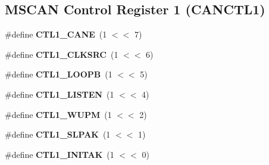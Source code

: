\subsection*{M\+S\+C\+AN Control Register 1 (C\+A\+N\+C\+T\+L1)}
\begin{DoxyCompactItemize}
\item 
\mbox{\label{group__RTEMSBSPsPowerPCGen5200MSCAN_ga63a460e6d53da309fdd802b6433c9d5c}} 
\#define {\bfseries C\+T\+L1\+\_\+\+C\+A\+NE}~(1 $<$$<$ 7)
\item 
\mbox{\label{group__RTEMSBSPsPowerPCGen5200MSCAN_ga483f0746def409e9401b160332e706be}} 
\#define {\bfseries C\+T\+L1\+\_\+\+C\+L\+K\+S\+RC}~(1 $<$$<$ 6)
\item 
\mbox{\label{group__RTEMSBSPsPowerPCGen5200MSCAN_gaa74191bc7035b62fa6fd2458c4c1044d}} 
\#define {\bfseries C\+T\+L1\+\_\+\+L\+O\+O\+PB}~(1 $<$$<$ 5)
\item 
\mbox{\label{group__RTEMSBSPsPowerPCGen5200MSCAN_gaf1ab39a91e5615c63320a7ff9d253eaf}} 
\#define {\bfseries C\+T\+L1\+\_\+\+L\+I\+S\+T\+EN}~(1 $<$$<$ 4)
\item 
\mbox{\label{group__RTEMSBSPsPowerPCGen5200MSCAN_gab6910518e9c7ed3936f9de3232826ef9}} 
\#define {\bfseries C\+T\+L1\+\_\+\+W\+U\+PM}~(1 $<$$<$ 2)
\item 
\mbox{\label{group__RTEMSBSPsPowerPCGen5200MSCAN_ga06c10d9ea77c6da19b80090d9d3df2d4}} 
\#define {\bfseries C\+T\+L1\+\_\+\+S\+L\+P\+AK}~(1 $<$$<$ 1)
\item 
\mbox{\label{group__RTEMSBSPsPowerPCGen5200MSCAN_ga308708468b08d6ad889e25559cabbc8f}} 
\#define {\bfseries C\+T\+L1\+\_\+\+I\+N\+I\+T\+AK}~(1 $<$$<$ 0)
\end{DoxyCompactItemize}
